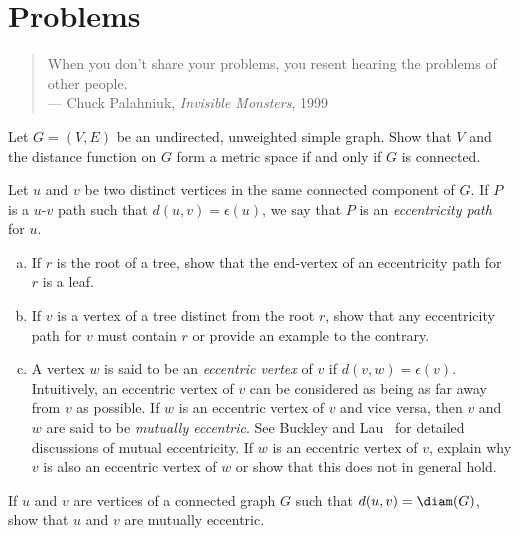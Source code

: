 
\section{Problems}

\begin{quote}
\footnotesize
When you don't share your problems, you resent hearing the problems of
other people. \\
\noindent
--- Chuck Palahniuk, \emph{Invisible Monsters}, 1999
\end{quote}

\begin{problem}
\item Let $G = (V,E)$ be an undirected, unweighted simple graph. Show
  that $V$ and the distance function on $G$
  form a metric space if and only if $G$ is connected.

\item Let $u$ and $v$ be two distinct vertices in the same connected
  component of $G$. If $P$ is a $u$-$v$ path such that
  $d(u,v) = \epsilon(u)$, we say that $P$ is an
  \emph{eccentricity path} for $u$.
  \begin{enumerate}[(a)]
  \item If $r$ is the root of a tree, show that the end-vertex of an
    eccentricity path for $r$ is a leaf.

  \item If $v$ is a vertex of a tree distinct from the root $r$, show
    that any eccentricity path for $v$ must contain $r$ or provide an
    example to the contrary.

  \item A vertex $w$ is said to be an
    \emph{eccentric vertex} of $v$ if
    $d(v,w) = \epsilon(v)$. Intuitively, an eccentric vertex of $v$
    can be considered as being as far away from $v$ as possible. If
    $w$ is an eccentric vertex of $v$ and vice versa, then $v$ and $w$
    are said to be
    \emph{mutually eccentric}. See Buckley
    and Lau~\cite{BuckleyLau2003} for detailed discussions of mutual
    eccentricity. If $w$ is an eccentric vertex of $v$, explain why
    $v$ is also an eccentric vertex of $w$ or show that this does not
    in general hold.
  \end{enumerate}

\item If $u$ and $v$ are vertices of a connected graph $G$ such that
  $d(u,v) = \diam(G)$, show that $u$ and $v$ are mutually eccentric.


\end{problem}
